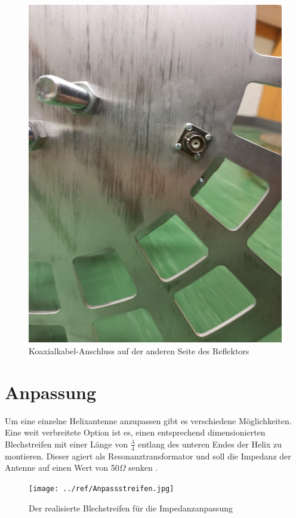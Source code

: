 \begin{figure}[h!]
	\centering
	\includegraphics[width=\textwidth]{../ref/BNC-Buchse.jpg}
	\caption{Koaxialkabel-Anschluss auf der anderen Seite des Reflektors}
	\label{fig:BNC-Buchse}
\end{figure}

\section{Anpassung}
Um eine einzelne Helixantenne anzupassen gibt es verschiedene Möglichkeiten. Eine weit verbreitete Option ist es, einen entsprechend dimensionierten Blechstreifen mit einer Länge von $\frac{\lambda}{4}$ entlang des unteren Endes der Helix zu montieren. Dieser agiert als Resonanztransformator und soll die Impedanz der Antenne auf einen Wert von 50$\Omega$ senken \cite{kgwadi_parametric_2014}.

\begin{figure}[h!]
	\centering
	\texttt{[image: ../ref/Anpassstreifen.jpg]}
	\caption{Der realisierte Blechstreifen für die Impedanzanpassung}
	\label{fig:matching-strip}
\end{figure}

